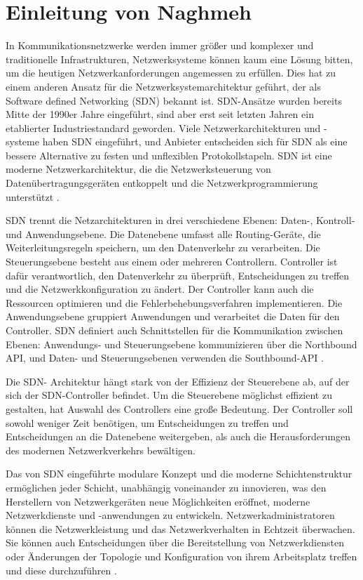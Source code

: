 \documentclass[fontsize=12pt,paper=a4,open=any,parskip=half,
  twoside=false,toc=listof,toc=bibliography,fleqn,leqno,
  captions=nooneline,captions=tableabove,british]{scrbook}
\begin{document}
\section*{Einleitung von Naghmeh}\label{einl-naghmeh}
In Kommunikationsnetzwerke werden immer größer und komplexer und traditionelle Infrastrukturen, Netzwerksysteme können kaum eine Lösung bitten, um die heutigen Netzwerkanforderungen angemessen zu erfüllen. Dies hat zu einem anderen Ansatz für die Netzwerksystemarchitektur geführt, der als Software defined Networking (SDN) bekannt ist. SDN-Ansätze wurden bereits Mitte der 1990er Jahre eingeführt, sind aber erst seit letzten Jahren ein etablierter Industriestandard geworden. Viele Netzwerkarchitekturen und -systeme haben SDN eingeführt, und Anbieter entscheiden sich für SDN als eine bessere Alternative zu festen und unflexiblen Protokollstapeln. SDN ist eine moderne Netzwerkarchitektur, die die Netzwerksteuerung von Datenübertragungsgeräten entkoppelt und die Netzwerkprogrammierung unterstützt \cite{gelberger2013performance}.\par
SDN trennt die Netzarchitekturen in drei verschiedene Ebenen: Daten-, Kontroll- und Anwendungsebene. Die Datenebene umfasst alle Routing-Geräte, die Weiterleitungsregeln speichern, um den Datenverkehr zu verarbeiten. Die Steuerungsebene besteht aus einem oder mehreren Controllern. Controller ist dafür verantwortlich, den Datenverkehr zu überprüft, Entscheidungen zu treffen und die Netzwerkkonfiguration zu ändert. Der Controller kann auch die Ressourcen optimieren und die Fehlerbehebungsverfahren implementieren. Die Anwendungsebene gruppiert Anwendungen und verarbeitet die Daten für den Controller. SDN definiert auch Schnittstellen für die Kommunikation zwischen Ebenen: Anwendungs- und Steuerungsebene kommunizieren über die Northbound API, und Daten- und Steuerungsebenen verwenden die Southbound-API \cite{rastogi2016comparative}.\par
Die SDN- Architektur hängt stark von der Effizienz der Steuerebene ab, auf der sich der SDN-Controller befindet. Um die Steuerebene möglichst effizient zu gestalten, hat Auswahl des Controllers eine große Bedeutung. Der Controller soll  sowohl weniger Zeit benötigen, um Entscheidungen zu treffen und Entscheidungen an die Datenebene weitergeben, als auch die Herausforderungen des modernen Netzwerkverkehrs bewältigen\cite{rastogi2016comparative}.\par
Das von SDN eingeführte modulare Konzept und die moderne Schichtenstruktur ermöglichen jeder Schicht, unabhängig voneinander zu innovieren, was den Herstellern von Netzwerkgeräten neue Möglichkeiten eröffnet, moderne Netzwerkdienste und -anwendungen zu entwickeln. Netzwerkadministratoren können die Netzwerkleistung und das Netzwerkverhalten in Echtzeit überwachen. Sie können auch Entscheidungen über die Bereitstellung von Netzwerkdiensten oder Änderungen der Topologie und Konfiguration von ihrem Arbeitsplatz treffen und diese durchzuführen \cite{hasan2020sdn}.\par
\end{document}
